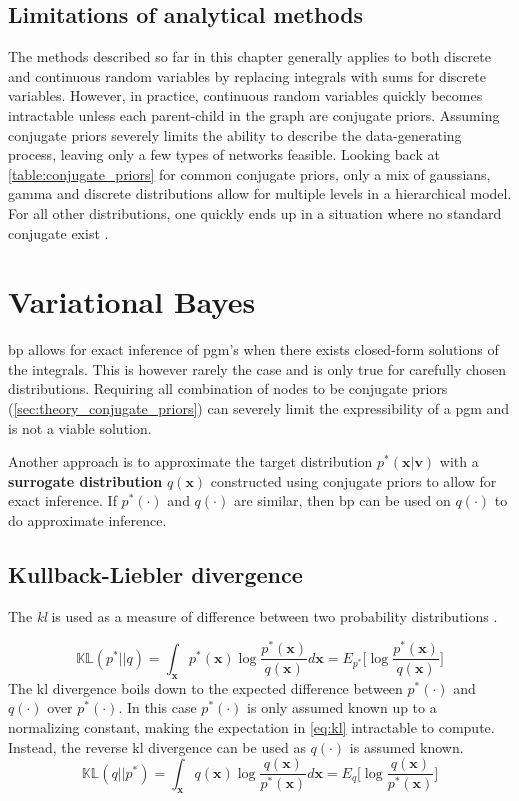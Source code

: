 \subsection{Limitations of analytical methods}
The methods described so far in this chapter generally applies to both discrete and continuous random variables by replacing integrals with sums for discrete variables. However, in practice, continuous random variables quickly becomes intractable unless each parent-child in the graph are conjugate priors. Assuming conjugate priors severely limits the ability to describe the data-generating process, leaving only a few types of networks feasible. Looking back at \cref{table:conjugate_priors} for common conjugate priors, only a mix of gaussians, gamma and discrete distributions allow for multiple levels in a hierarchical model. For all other distributions, one quickly ends up in a situation where no standard conjugate exist \cite{winnbishop}. 
\section{Variational Bayes}
\acrshort{bp} allows for exact inference of \acrshort{pgm}'s when there exists closed-form solutions of the integrals. This is however rarely the case and is only true for carefully chosen distributions. Requiring all combination of nodes to be conjugate priors (\cref{sec:theory_conjugate_priors}) can severely limit the expressibility of a \acrshort{pgm} and is not a viable solution. 

Another approach is to approximate the target distribution $p^*(\mathbf{x} | \mathbf{v})$ with a \textbf{surrogate distribution} $q(\mathbf{x})$ constructed using conjugate priors to allow for exact inference. If $p^*(\cdot)$ and $q(\cdot)$ are similar, then \acrshort{bp} can be used on $q(\cdot)$ to do approximate inference.

\subsection{Kullback-Liebler divergence}
The \textit{\acrfull{kl}}  is used as a measure of difference between two probability distributions \cite{kullback1951,murphy}.

\begin{equation}\label{eq:kl}
    \mathbb{KL}(p^* || q) = \int_\mathbf{x} p^*(\mathbf{x}) \log \frac{p^*(\mathbf{x})}{q(\mathbf{x})} d\mathbf{x} = E_{p^*} \big[ \log \frac{p^*(\mathbf{x})}{q(\mathbf{x})} \big]
\end{equation}
The \acrshort{kl} divergence boils down to the expected difference between $p^*(\cdot)$ and $q(\cdot)$ over $p^*(\cdot)$.
In this case $p^*(\cdot)$ is only assumed known up to a normalizing constant, making the expectation in \cref{eq:kl} intractable to compute. Instead, the reverse \acrshort{kl} divergence can be used as $q(\cdot)$ is assumed known.
\begin{equation}\label{eq:reverse_kl}
    \mathbb{KL}(q || p^*) = \int_\mathbf{x} q(\mathbf{x}) \log \frac{q(\mathbf{x})}{p^*(\mathbf{x})} d\mathbf{x} = E_{q} \big[ \log \frac{q(\mathbf{x})}{p^*(\mathbf{x})} \big]
\end{equation}

